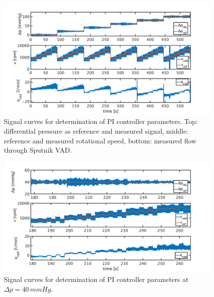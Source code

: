 \begin{figure}[ht]
  \centering
  \includegraphics[width=\textwidth]{images/chapt_5/dyn_measure.pdf}
  \caption[Signal curves for determination of PI controller parameters]{Signal curves for determination of PI controller parameters. Top: differential pressure as reference and measured signal, middle: reference and measured rotational speed, bottom: measured flow through Sputnik VAD.}
  \label{fig:dyn_meas}
\end{figure}

\begin{figure}[ht]
  \centering
  \includegraphics[width=\textwidth]{images/chapt_5/dyn_meas_40.pdf}
  \caption[Signal curves for determination of PI controller parameters at $\Delta{p}=40\,mmHg$]{Signal curves for determination of PI controller parameters at $\Delta{p}=40\,mmHg$.}
  \label{fig:dyn_meas_40}
\end{figure}

